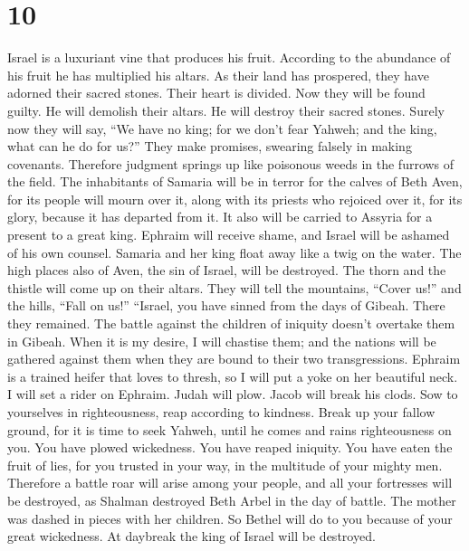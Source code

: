 \hypertarget{section-9}{%
\section{10}\label{section-9}}

 Israel is a luxuriant vine that produces his fruit.
According to the abundance of his fruit he has multiplied his altars. As
their land has prospered, they have adorned their sacred stones.
 Their heart is divided. Now they will be found guilty. He
will demolish their altars. He will destroy their sacred stones.
 Surely now they will say, ``We have no king; for we don't
fear Yahweh; and the king, what can he do for us?''  They
make promises, swearing falsely in making covenants. Therefore judgment
springs up like poisonous weeds in the furrows of the field.
 The inhabitants of Samaria will be in terror for the
calves of Beth Aven, for its people will mourn over it, along with its
priests who rejoiced over it, for its glory, because it has departed
from it.  It also will be carried to Assyria for a present
to a great king. Ephraim will receive shame, and Israel will be ashamed
of his own counsel.  Samaria and her king float away like
a twig on the water.  The high places also of Aven, the
sin of Israel, will be destroyed. The thorn and the thistle will come up
on their altars. They will tell the mountains, ``Cover us!'' and the
hills, ``Fall on us!''  ``Israel, you have sinned from the
days of Gibeah. There they remained. The battle against the children of
iniquity doesn't overtake them in Gibeah.  When it is my
desire, I will chastise them; and the nations will be gathered against
them when they are bound to their two transgressions. 
Ephraim is a trained heifer that loves to thresh, so I will put a yoke
on her beautiful neck. I will set a rider on Ephraim. Judah will plow.
Jacob will break his clods.  Sow to yourselves in
righteousness, reap according to kindness. Break up your fallow ground,
for it is time to seek Yahweh, until he comes and rains righteousness on
you.  You have plowed wickedness. You have reaped
iniquity. You have eaten the fruit of lies, for you trusted in your way,
in the multitude of your mighty men.  Therefore a battle
roar will arise among your people, and all your fortresses will be
destroyed, as Shalman destroyed Beth Arbel in the day of battle. The
mother was dashed in pieces with her children.  So Bethel
will do to you because of your great wickedness. At daybreak the king of
Israel will be destroyed.

